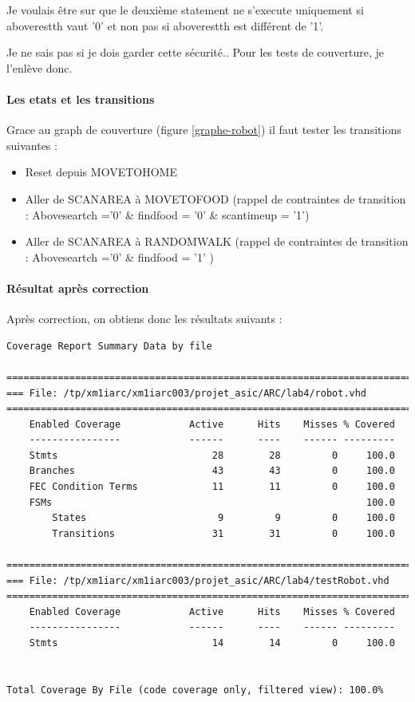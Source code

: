 \documentclass{article}
\newcommand{\sautligne}{
\textbf{\vspace{5mm}}
}
\begin{document}
Je voulais être sur que le deuxième statement ne s'execute uniquement si aboverestth vaut '0' et non pas si aboverestth est différent de '1'.

Je ne sais pas si je dois garder cette sécurité.. Pour les tests de couverture, je l'enlève donc.

\sautligne

\paragraph{Les etats et les transitions}
Grace au graph de couverture (figure \ref{graphe-robot}) il faut tester les transitions suivantes :
\begin{itemize}
\item Reset depuis MOVETOHOME
\item Aller de SCANAREA à MOVETOFOOD (rappel de contraintes de transition : Aboveseartch ='0' \& findfood = '0' \& scantimeup = '1')
\item Aller de SCANAREA à RANDOMWALK (rappel de contraintes de transition : Aboveseartch ='0' \& findfood = '1' )
\end{itemize}

\paragraph{Résultat après correction}
Après correction, on obtiens donc les résultats suivants :

\begin{verbatim}
Coverage Report Summary Data by file

=================================================================================
=== File: /tp/xm1iarc/xm1iarc003/projet_asic/ARC/lab4/robot.vhd
=================================================================================
    Enabled Coverage            Active      Hits    Misses % Covered
    ----------------            ------      ----    ------ ---------
    Stmts                           28        28         0     100.0
    Branches                        43        43         0     100.0
    FEC Condition Terms             11        11         0     100.0
    FSMs                                                       100.0
        States                       9         9         0     100.0
        Transitions                 31        31         0     100.0

=================================================================================
=== File: /tp/xm1iarc/xm1iarc003/projet_asic/ARC/lab4/testRobot.vhd
=================================================================================
    Enabled Coverage            Active      Hits    Misses % Covered
    ----------------            ------      ----    ------ ---------
    Stmts                           14        14         0     100.0


Total Coverage By File (code coverage only, filtered view): 100.0%
\end{verbatim}
\end{document}
